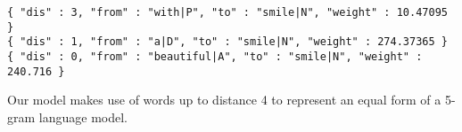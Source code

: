 \begin{verbatim}
{ "dis" : 3, "from" : "with|P", "to" : "smile|N", "weight" : 10.47095 }
{ "dis" : 1, "from" : "a|D", "to" : "smile|N", "weight" : 274.37365 }
{ "dis" : 0, "from" : "beautiful|A", "to" : "smile|N", "weight" : 240.716 }
\end{verbatim}



Our model makes use of words up to distance 4 to represent an equal form of a 5-gram language model.
